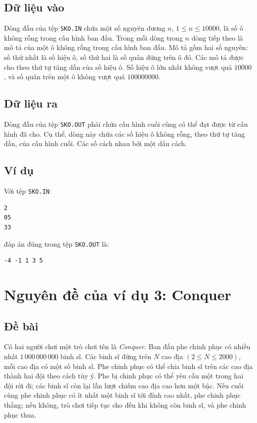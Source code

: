 \documentclass[11pt]{article}
\begin{document}
\subsection*{Dữ liệu vào}

Dòng đầu của tệp \texttt{SKO.IN} chứa một số nguyên dương \(n\),
\(1\le n\le 10000\), là số ô không rỗng trong cấu hình ban đầu. Trong mỗi dòng
trong \(n\) dòng tiếp theo là mô tả của một ô không rỗng trong cấu hình ban
đầu. Mô tả gồm hai số nguyên: số thứ nhất là số hiệu ô, số thứ hai là số quân
đứng trên ô đó. Các mô tả được cho theo thứ tự tăng dần của số hiệu ô. Số hiệu
ô lớn nhất không vượt quá \(10000\), và số quân trên một ô không vượt quá
\(100000000\).

\subsection*{Dữ liệu ra}

Dòng đầu của tệp \texttt{SKO.OUT} phải chứa cấu hình cuối cùng có thể đạt được
từ cấu hình đã cho. Cụ thể, dòng này chứa các số hiệu ô không rỗng, theo thứ
tự tăng dần, của cấu hình cuối. Các số cách nhau bởi một dấu cách.

\subsection*{Ví dụ}

Với tệp \texttt{SKO.IN}:
\begin{verbatim}
2
05
33
\end{verbatim}
đáp án đúng trong tệp \texttt{SKO.OUT} là:
\begin{verbatim}
-4 -1 1 3 5
\end{verbatim}

\section{Nguyên đề của ví dụ 3: Conquer}

\subsection*{Đề bài}

Có hai người chơi một trò chơi tên là \textit{Conquer}. Ban đầu phe chinh phục
có nhiều nhất \(1\,000\,000\,000\) binh sĩ. Các binh sĩ đứng trên \(N\) cao
địa \((2\le N\le 2000)\), mỗi cao địa có một số binh sĩ. Phe chinh phục có
thể chia binh sĩ trên các cao địa thành hai đội theo cách tùy ý. Phe bị chinh
phục có thể yêu cầu một trong hai đội rời đi; các binh sĩ còn lại lần lượt
chiếm cao địa cao hơn một bậc. Nếu cuối cùng phe chinh phục có ít nhất một
binh sĩ tới đỉnh cao nhất, phe chinh phục thắng; nếu không, trò chơi tiếp tục
cho đến khi không còn binh sĩ, và phe chinh phục thua.
\end{document}
